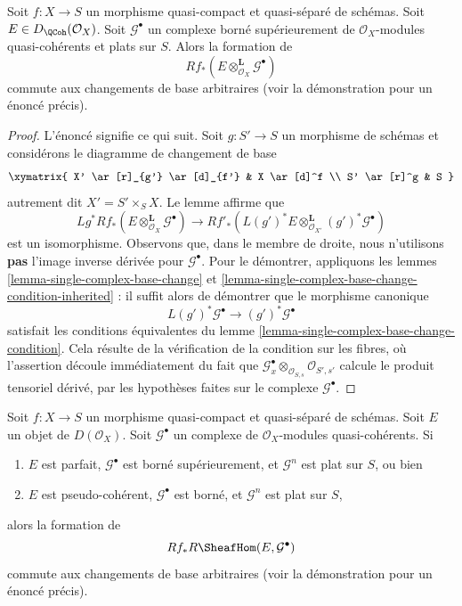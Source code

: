 \begin{lemma}
\label{lemma-base-change-tensor}
Soit $f : X \to S$ un morphisme quasi-compact et quasi-séparé de
schémas. Soit $E \in D_\QCoh(\mathcal{O}_X)$. Soit $\mathcal{G}^\bullet$
un complexe borné supérieurement de $\mathcal{O}_X$-modules
quasi-cohérents et plats sur $S$. Alors la formation de
$$
Rf_*(E \otimes^\mathbf{L}_{\mathcal{O}_X} \mathcal{G}^\bullet)
$$
commute aux changements de base arbitraires (voir la démonstration pour un énoncé précis).
\end{lemma}

\begin{proof}
L'énoncé signifie ce qui suit. Soit $g : S' \to S$ un morphisme de
schémas et considérons le diagramme de changement de base
$$
\xymatrix{
X' \ar[r]_{g'} \ar[d]_{f'} &
X \ar[d]^f \\
S' \ar[r]^g &
S
}
$$
autrement dit $X' = S' \times_S X$. Le lemme affirme que
$$
Lg^*Rf_*(E \otimes^\mathbf{L}_{\mathcal{O}_X} \mathcal{G}^\bullet)
\longrightarrow
Rf'_*\left(
L(g')^*E \otimes^\mathbf{L}_{\mathcal{O}_{X'}} (g')^*\mathcal{G}^\bullet
\right)
$$
est un isomorphisme. Observons que, dans le membre de droite, nous n'utilisons
{\bf pas} l'image inverse dérivée pour $\mathcal{G}^\bullet$.
Pour le démontrer, appliquons les lemmes \ref{lemma-single-complex-base-change} et
\ref{lemma-single-complex-base-change-condition-inherited} : il suffit alors de démontrer que le morphisme canonique
$$
L(g')^*\mathcal{G}^\bullet \to (g')^*\mathcal{G}^\bullet
$$
satisfait les conditions équivalentes du
lemme \ref{lemma-single-complex-base-change-condition}.
Cela résulte de la vérification de la condition sur les fibres, où l'assertion
découle immédiatement du fait que
$\mathcal{G}^\bullet_x \otimes_{\mathcal{O}_{S, s}} \mathcal{O}_{S', s'}$
calcule le produit tensoriel dérivé, par les hypothèses faites sur le complexe
$\mathcal{G}^\bullet$.
\end{proof}

\begin{lemma}
\label{lemma-base-change-RHom}
Soit $f : X \to S$ un morphisme quasi-compact et quasi-séparé de schémas.
Soit $E$ un objet de $D(\mathcal{O}_X)$.
Soit $\mathcal{G}^\bullet$ un complexe de
$\mathcal{O}_X$-modules quasi-cohérents. Si
\begin{enumerate}
\item $E$ est parfait, $\mathcal{G}^\bullet$ est borné supérieurement,
et $\mathcal{G}^n$ est plat sur $S$, ou bien
\item $E$ est pseudo-cohérent, $\mathcal{G}^\bullet$ est borné,
et $\mathcal{G}^n$ est plat sur $S$,
\end{enumerate}
alors la formation de
$$
Rf_*R\SheafHom(E, \mathcal{G}^\bullet)
$$
commute aux changements de base arbitraires (voir la démonstration pour un énoncé précis).
\end{lemma}

